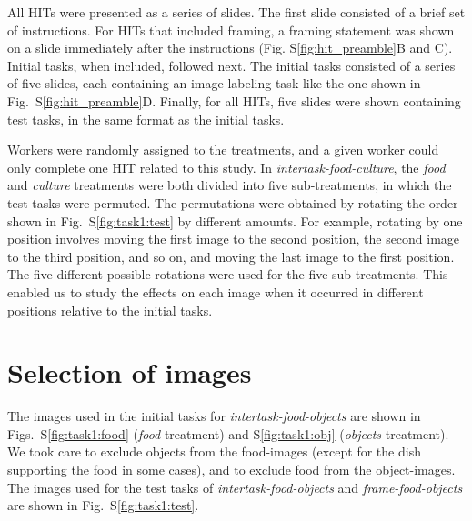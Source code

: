 \documentclass{pnastwo}
\begin{document}
\begin{article}
\begin{materials}
All HITs were presented as a series of slides.  The first slide consisted of a
brief set of instructions.  For HITs that included framing, a framing statement
was shown on a slide immediately after the instructions (Fig.
S\ref{fig:hit_preamble}B and C).  Initial tasks, when included, followed next.
The initial tasks consisted of a series of five slides, each containing an
image-labeling task like the one shown in Fig.~S\ref{fig:hit_preamble}D.
Finally, for all HITs, five slides were shown containing test tasks, in the
same format as the initial tasks.

Workers were randomly assigned to the treatments, and a given worker could only
complete one HIT related to this study.  In \textit{intertask-food-culture},
the \textit{food} and \textit{culture} treatments were both divided into five
sub-treatments, in which the test tasks were permuted.  The permutations were
obtained by rotating the order shown in Fig.~S\ref{fig:task1:test} by different
amounts.  For example, rotating by one position involves moving the first image
to the second position, the second image to the third position, and so on, and
moving the last image to the first position.  The five different possible
rotations were used for the five sub-treatments.  This enabled us to study the
effects on each image when it occurred in different positions relative to the
initial tasks.

\section{Selection of images} The images used in the initial tasks for
\textit{intertask-food-objects}  are shown in Figs.~S\ref{fig:task1:food}
(\textit{food} treatment) and S\ref{fig:task1:obj} (\textit{objects}
treatment).  We took care to exclude objects from the food-images (except for
the dish supporting the food in some cases), and to exclude food from the
object-images.  The images used for the test tasks of
\textit{intertask-food-objects} and \textit{frame-food-objects} are shown in
Fig.~S\ref{fig:task1:test}.


\end{materials}
\end{article}
\end{document}
